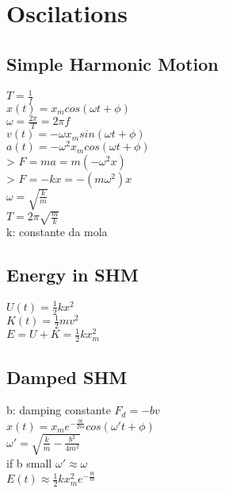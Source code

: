 \section{Oscilations}
\subsection*{Simple Harmonic Motion}
$T=\frac{1}{f}$\\
$x\left(t\right)=x_mcos\left(\omega t+\phi \right)$\\
$\omega =\frac{2\pi }{T}=2\pi f$\\
$v\left(t\right)=-\omega x_msin\left(\omega t+\phi \right)$\\
$a\left(t\right)=-\omega ^2x_mcos\left(\omega t+\phi \right)$\\
> $F=ma=m\left(-\omega ^2x\right)$\\
> $F=-kx=-\left(m\omega ^2\right)x$\\
$\omega =\sqrt{\frac{k}{m}}$\\
$T=2\pi \sqrt{\frac{m}{k}}$\\
k: constante da mola
\subsection*{Energy in SHM}
$U\left(t\right)=\frac{1}{2}kx^2$\\
$K\left(t\right)=\frac{1}{2}mv^2$\\
$E=U+K=\frac{1}{2}kx_m^2$\\
\subsection*{Damped SHM}
b: damping constante
$F_d=-bv$\\
$x\left(t\right)=x_me^{-\frac{bt}{2m}}cos\left(\omega 't+\phi \right)$\\
$\omega '=\sqrt{\frac{k}{m}-\frac{b^2}{4m^2}}$\\
if b small  $\omega '\approx \omega$\\
$E\left(t\right)\approx \frac{1}{2}kx_m^2e^{-\frac{bt}{m}}$\\
